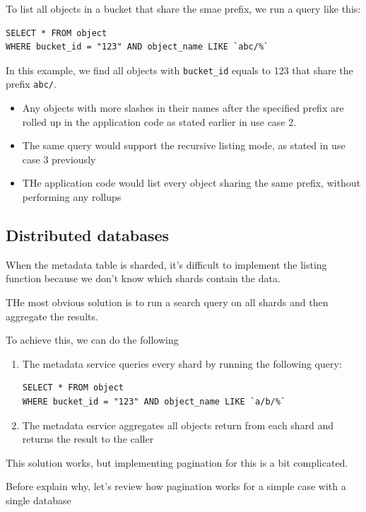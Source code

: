 \documentclass{report}
\theoremstyle{definition}
\let\oldsubsection\subsection
\renewcommand{\subsection}{\oldsubsection*}
\begin{document}
To list all objects in a bucket that share the smae prefix, we run a query like this:

\begin{lstlisting}
SELECT * FROM object
WHERE bucket_id = "123" AND object_name LIKE `abc/%`
\end{lstlisting}

In this example, we find all objects with \lstinline|bucket_id| equals to 123 that share the prefix \lstinline|abc/|.

\begin{itemize}
\item
Any objects with more slashes in their names after the specified prefix are rolled up in the application code as stated earlier in use case 2.
\item
The same query would support the recursive listing mode, as stated in use case 3 previously
\item
THe application code would list every object sharing the same prefix, without performing any rollups
\end{itemize}

\subsection{Distributed databases}

When the metadata table is sharded, it's difficult to implement the listing function because we don't know which shards contain the data.

THe most obvious solution is to run a search query on all shards and then aggregate the results.

To achieve this, we can do the following

\begin{enumerate}
\item
The metadata service queries every shard by running the following query:

\begin{lstlisting}
SELECT * FROM object
WHERE bucket_id = "123" AND object_name LIKE `a/b/%`
\end{lstlisting}
\item
The metadata esrvice aggregates all objects return from each shard and returns the result to the caller
\end{enumerate}

This solution works, but implementing pagination for this is a bit complicated.

Before explain why, let's review how pagination works for a simple case with a single database
\end{document}
